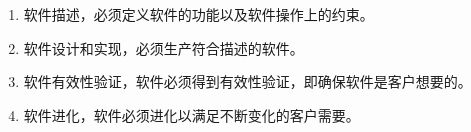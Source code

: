 \begin{enumerate}
	\item 软件描述，必须定义软件的功能以及软件操作上的约束。
	\item 软件设计和实现，必须生产符合描述的软件。
	\item 软件有效性验证，软件必须得到有效性验证，即确保软件是客户想要的。
	\item 软件进化，软件必须进化以满足不断变化的客户需要。
\end{enumerate}